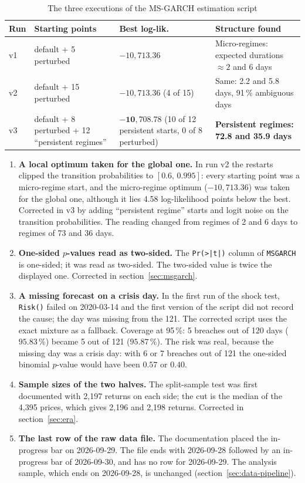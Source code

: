 \documentclass[12pt,a4paper]{article}
\begin{document}
\begin{table}[H]
	\centering
	\small
	\caption{The three executions of the MS-GARCH estimation script}
	\label{tab:ms-runs}
	\begin{tabular}{lp{3.2cm}p{4.2cm}p{4.2cm}}
		\toprule
		Run & Starting points & Best log-lik. & Structure found \\
		\midrule
		v1 & default + 5 perturbed & $-10{,}713.36$ & Micro-regimes: expected durations $\approx 2$ and 6 days \\
		v2 & default + 15 perturbed & $-10{,}713.36$ (4 of 15) & Same: 2.2 and 5.8 days, 91\,\% ambiguous days \\
		v3 & default + 8 perturbed + 12 ``persistent regimes'' & $\mathbf{-10{,}708.78}$ (10 of 12 persistent starts, 0 of 8 perturbed) & \textbf{Persistent regimes: 72.8 and 35.9 days} \\
		\bottomrule
	\end{tabular}
\end{table}

\begin{enumerate}
	\item \textbf{A local optimum taken for the global one.} In run v2 the restarts clipped the transition probabilities to $[0.6,\,0.995]$: every starting point was a micro-regime start, and the micro-regime optimum ($-10{,}713.36$) was taken for the global one, although it lies 4.58 log-likelihood points below the best. Corrected in v3 by adding ``persistent regime'' starts and logit noise on the transition probabilities. The reading changed from regimes of 2 and 6 days to regimes of 73 and 36 days.
	\item \textbf{One-sided $p$-values read as two-sided.} The \texttt{Pr(>|t|)} column of \texttt{MSGARCH} is one-sided; it was read as two-sided. The two-sided value is twice the displayed one. Corrected in section~\ref{sec:msgarch}.
	\item \textbf{A missing forecast on a crisis day.} In the first run of the shock test, \texttt{Risk()} failed on 2020-03-14 and the first version of the script did not record the cause; the day was missing from the 121. The corrected script uses the exact mixture as a fallback. Coverage at 95\,\%: 5 breaches out of 120 days ($95.83\,\%$) became 5 out of 121 ($95.87\,\%$). The risk was real, because the missing day was a crisis day: with 6 or 7 breaches out of 121 the one-sided binomial $p$-value would have been $0.57$ or $0.40$.
	\item \textbf{Sample sizes of the two halves.} The split-sample test was first documented with 2,197 returns on each side; the cut is the median of the 4,395 prices, which gives 2,196 and 2,198 returns. Corrected in section~\ref{sec:era}.
	\item \textbf{The last row of the raw data file.} The documentation placed the in-progress bar on 2026-09-29. The file ends with 2026-09-28 followed by an in-progress bar of 2026-09-30, and has no row for 2026-09-29. The analysis sample, which ends on 2026-09-28, is unchanged (section~\ref{sec:data-pipeline}).
\end{enumerate}
\end{document}
